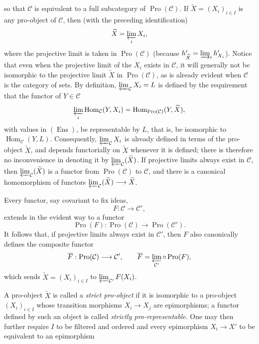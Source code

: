 so that $\mathcal C$ is equivalent to a full subcategory of
$\operatorname{Pro}(\mathcal C)$. If
$\widetilde X=(X_i)_{i\in I}$ is any pro-object of $\mathcal C$, then (with the
preceding identification)
\[
  \widetilde X=\varprojlim_i X_i,
\]
where the projective limit is taken in $\operatorname{Pro}(\mathcal C)$
(because $h'_{\widetilde X}=\varinjlim_i h'_{X_i}$). Notice that even when the
projective limit of the $X_i$ exists in $\mathcal C$, it will generally not be
isomorphic to the projective limit $\widetilde X$ in
$\operatorname{Pro}(\mathcal C)$, as is already evident when $\mathcal C$ is
the category of sets. By definition,
$\varprojlim_{\mathcal C}X_i=L$ is defined by the requirement that the functor
of $Y\in\mathcal C$
\[
  \varprojlim_i\operatorname{Hom}_{\mathcal C}(Y,X_i)
  =\operatorname{Hom}_{\operatorname{Pro}(\mathcal C)}(Y,\widetilde X),
\]
with values in $(\operatorname{Ens})$, be representable by $L$, that is, be
isomorphic to $\operatorname{Hom}_{\mathcal C}(Y,L)$. Consequently,
$\varprojlim_{\mathcal C}X_i$ is already defined in terms of the pro-object
$\widetilde X$, and depends functorially on $\widetilde X$ whenever it is
defined; there is therefore no inconvenience in denoting it by
$\varprojlim_{\mathcal C}(\widetilde X)$. If projective limits always exist in
$\mathcal C$, then $\varprojlim_{\mathcal C}(\widetilde X)$ is a functor from
$\operatorname{Pro}(\mathcal C)$ to $\mathcal C$, and there is a canonical
homomorphism of functors
$\varprojlim_{\mathcal C}(\widetilde X)\longrightarrow\widetilde X$.

Every functor, say covariant to fix ideas,
\[
  F:\mathcal C\longrightarrow\mathcal C',
\]
extends in the evident way to a functor
\[
  \operatorname{Pro}(F):\operatorname{Pro}(\mathcal C)
  \longrightarrow\operatorname{Pro}(\mathcal C').
\]
It follows that, if projective limits always exist in $\mathcal C'$, then $F$
also canonically defines the composite functor
\[
  \overline F:\operatorname{Pro}(\mathcal C)\longrightarrow\mathcal C',
  \qquad
  \overline F=\varprojlim_{\mathcal C'}\circ\operatorname{Pro}(F),
\]
which sends $\widetilde X=(X_i)_{i\in I}$ to
$\varprojlim_{\mathcal C'}F(X_i)$.

A pro-object $\widetilde X$ is called a \emph{strict pro-object} if it is
isomorphic to a pro-object $(X_i)_{i\in I}$ whose transition morphisms
$X_i\longrightarrow X_j$ are epimorphisms; a functor defined by such an object
is called \emph{strictly pro-representable}. One may then further require $I$
to be filtered and ordered and every epimorphism $X_i\longrightarrow X'$ to be
equivalent to an epimorphism

